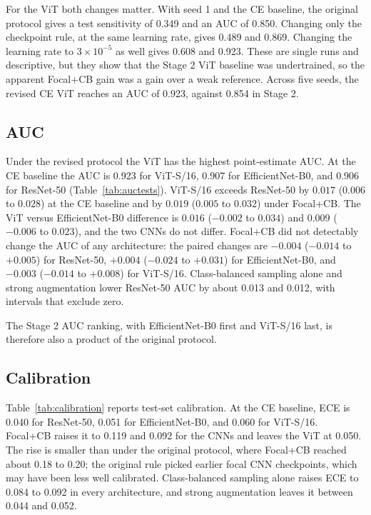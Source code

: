For the ViT both changes matter. With seed 1 and the CE baseline, the original protocol gives a test sensitivity of 0.349 and an AUC of 0.850. Changing only the checkpoint rule, at the same learning rate, gives 0.489 and 0.869. Changing the learning rate to $3\times10^{-5}$ as well gives 0.608 and 0.923. These are single runs and descriptive, but they show that the Stage 2 ViT baseline was undertrained, so the apparent Focal+CB gain was a gain over a weak reference. Across five seeds, the revised CE ViT reaches an AUC of 0.923, against 0.854 in Stage 2.

\subsection{AUC}
\label{sec:auc}

Under the revised protocol the ViT has the highest point-estimate AUC. At the CE baseline the AUC is 0.923 for ViT-S/16, 0.907 for EfficientNet-B0, and 0.906 for ResNet-50 (Table~\ref{tab:auctests}). ViT-S/16 exceeds ResNet-50 by $0.017$ ($0.006$ to $0.028$) at the CE baseline and by $0.019$ ($0.005$ to $0.032$) under Focal+CB. The ViT versus EfficientNet-B0 difference is $0.016$ ($-0.002$ to $0.034$) and $0.009$ ($-0.006$ to $0.023$), and the two CNNs do not differ. Focal+CB did not detectably change the AUC of any architecture: the paired changes are $-0.004$ ($-0.014$ to $+0.005$) for ResNet-50, $+0.004$ ($-0.024$ to $+0.031$) for EfficientNet-B0, and $-0.003$ ($-0.014$ to $+0.008$) for ViT-S/16. Class-balanced sampling alone and strong augmentation lower ResNet-50 AUC by about 0.013 and 0.012, with intervals that exclude zero.

The Stage 2 AUC ranking, with EfficientNet-B0 first and ViT-S/16 last, is therefore also a product of the original protocol.



\subsection{Calibration}

Table~\ref{tab:calibration} reports test-set calibration. At the CE baseline, ECE is 0.040 for ResNet-50, 0.051 for EfficientNet-B0, and 0.060 for ViT-S/16. Focal+CB raises it to 0.119 and 0.092 for the CNNs and leaves the ViT at 0.050. The rise is smaller than under the original protocol, where Focal+CB reached about 0.18 to 0.20; the original rule picked earlier focal CNN checkpoints, which may have been less well calibrated. Class-balanced sampling alone raises ECE to 0.084 to 0.092 in every architecture, and strong augmentation leaves it between 0.044 and 0.052.

